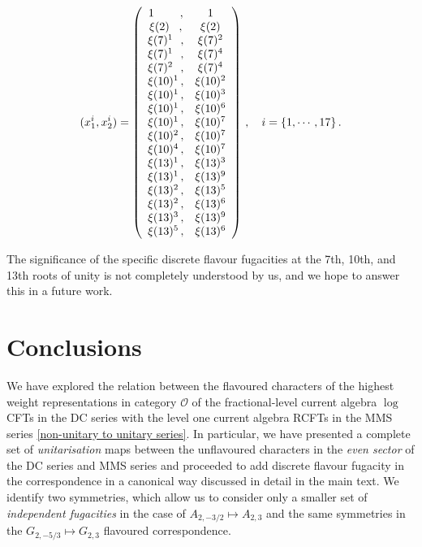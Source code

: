 \documentclass[a4paper,12pt]{article}
\begin{document}
\begingroup
\allowdisplaybreaks
\begin{align}
(x_1^i,x_2^i)=\left(
\begin{array}{cc}
 1\hspace{.8 cm} ,& 1 \\
 \xi(2)\, \, \, \, \, , & \xi(2) \\
 \xi(7)^1\, \, \, \,  , & \xi(7)^2 \\
 \xi(7)^1\, \, \, \,  , & \xi(7)^4 \\
 \xi(7)^2\, \, \, \, , & \xi(7)^4 \\
 \xi(10)^1\, , & \xi(10)^2 \\
\xi(10)^1\, , & \xi(10)^3 \\
 \xi(10)^1\, , & \xi(10)^6 \\
 \xi(10)^1\, , & \xi(10)^7 \\
 \xi(10)^2\, , & \xi(10)^7 \\
 \xi(10)^4\, , & \xi(10)^7 \\
 \xi(13)^1\, , & \xi(13)^3 \\
\xi(13)^1\, , & \xi(13)^9 \\
 \xi(13)^2\, , & \xi(13)^5 \\
 \xi(13)^2\, , & \xi(13)^6 \\
 \xi(13)^3\, , & \xi(13)^9 \\
 \xi(13)^5\, , & \xi(13)^6
\end{array}
\right)\, ,\quad i=\{1,\cdots,17\}\, .
\end{align}
\endgroup

The significance of the specific discrete flavour fugacities at the 7th, 10th, and 13th roots of unity is not completely understood by us, and we hope to answer this in a future work.

\section{Conclusions}\label{conclusions}

We have explored the relation between the flavoured characters of the highest weight representations in category $\mathcal{O}$ of the fractional-level current algebra $\log$ CFTs in the DC series with the level one current algebra RCFTs in the MMS series \eqref{non-unitary to unitary series}. In particular, we have presented a complete set of \textit{unitarisation} maps between the unflavoured characters in the \textit{even sector} of the DC series and MMS series and proceeded to add discrete flavour fugacity in the correspondence in a canonical way discussed in detail in the main text. We identify two symmetries, which allow us to consider only a smaller set of \textit{independent fugacities} in the case of $A_{2,-3/2}\mapsto A_{2,3}$ and the same symmetries in the $G_{2,-5/3}\mapsto G_{2,3}$ flavoured correspondence.
\end{document}
